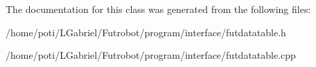 The documentation for this class was generated from the following files\+:\begin{DoxyCompactItemize}
\item 
/home/poti/\+L\+Gabriel/\+Futrobot/program/interface/futdatatable.\+h\item 
/home/poti/\+L\+Gabriel/\+Futrobot/program/interface/futdatatable.\+cpp\end{DoxyCompactItemize}
